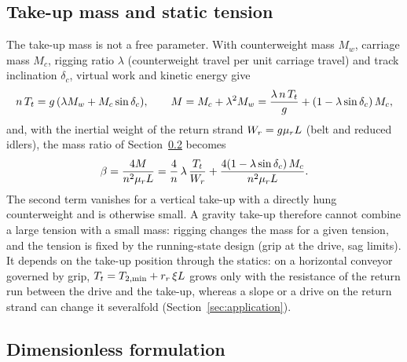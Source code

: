 \subsection{Take-up mass and static tension}\label{sec:static}

The take-up mass is not a free parameter. With counterweight mass $M_w$, carriage mass
$M_c$, rigging ratio $\lambda$ (counterweight travel per unit carriage travel) and track
inclination $\delta_c$, virtual work and kinetic energy give
\begin{equation}\label{eq:reeving}
  n\,T_t=g\,(\lambda M_w+M_c\sin\delta_c),\qquad
  M=M_c+\lambda^2M_w=\frac{\lambda\,n\,T_t}{g}+(1-\lambda\sin\delta_c)\,M_c ,
\end{equation}
and, with the inertial weight of the return strand $W_r=g\mu_rL$ (belt and reduced idlers), the mass ratio of
Section~\ref{sec:dimensionless} becomes
\begin{equation}\label{eq:beta_tension}
  \beta=\frac{4M}{n^2\mu_rL}
  =\frac{4}{n}\,\lambda\,\frac{T_t}{W_r}+\frac{4(1-\lambda\sin\delta_c)\,M_c}{n^2\mu_rL}.
\end{equation}
The second term vanishes for a vertical take-up with a directly hung counterweight and is
otherwise small. A gravity take-up therefore cannot combine a large tension with a small mass:
rigging changes the mass for a given tension, and the tension is fixed by the running-state
design (grip at the drive, sag limits). It depends on the take-up position through the statics: on a horizontal conveyor governed by grip,
$T_t=T_{2,\min}+r_r\,\xi L$ grows only with the resistance of the return run between the
drive and the take-up, whereas a slope or a drive on the return strand can change it
severalfold (Section~\ref{sec:application}).

\subsection{Dimensionless formulation}\label{sec:dimensionless}

